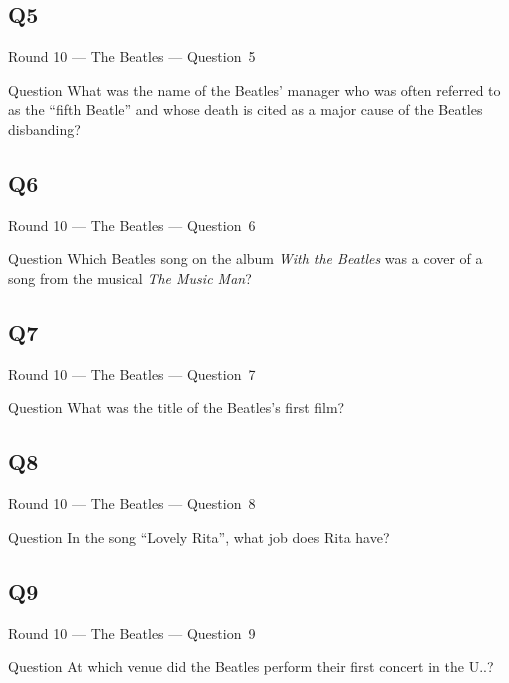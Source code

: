 \documentclass[11pt,draft]{beamer}
\begin{document}
\subsection*{Q5}
\begin{frame}[t]{Round 10 --- The Beatles --- \mbox{Question 5}}
    \begin{block}{Question}
        What was the name of the Beatles' manager who was often referred to as the ``fifth Beatle'' and whose death is cited as a major cause of the Beatles disbanding?
    \end{block}
\end{frame}
\subsection*{Q6}
\begin{frame}[t]{Round 10 --- The Beatles --- \mbox{Question 6}}
    \begin{block}{Question}
        Which Beatles song on the album \emph{With the Beatles} was a cover of a song from the musical \emph{The Music Man}?
    \end{block}
\end{frame}
\subsection*{Q7}
\begin{frame}[t]{Round 10 --- The Beatles --- \mbox{Question 7}}
    \begin{block}{Question}
        What was the title of the Beatles's first film?
    \end{block}
\end{frame}
\subsection*{Q8}
\begin{frame}[t]{Round 10 --- The Beatles --- \mbox{Question 8}}
    \begin{block}{Question}
        In the song ``Lovely Rita'', what job does Rita have?
    \end{block}
\end{frame}
\subsection*{Q9}
\begin{frame}[t]{Round 10 --- The Beatles --- \mbox{Question 9}}
    \begin{block}{Question}
        At which venue did the Beatles perform their first concert in the U.\@S.\@?
    \end{block}
\end{frame}
\end{document}
